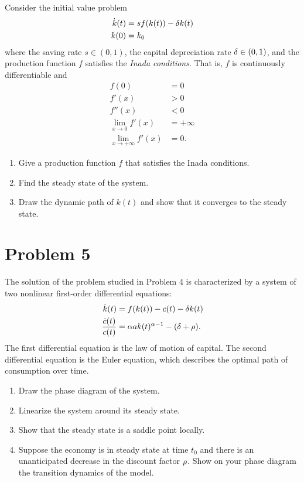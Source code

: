 \documentclass[letterpaper, 11pt, leqno]{article}
\begin{document}
Consider the initial value problem 
\begin{align*}
\dot{k}(t) &=s f(k(t)) -\delta k(t) \\
k(0) &=k_{0}
\end{align*}
where the saving rate $s\in (0,1)$, the capital depreciation rate $\delta \in (0,1)$, and the production function $f$ satisfies the \textit{Inada conditions}. That is, $f$ is continuously differentiable and 
\begin{align*}
f(0)&=0\\
f'(x)&>0\\
f''(x)&<0\\
\lim_{x\to 0} f'(x)&=+\infty\\
\lim_{x\to +\infty} f'(x)&=0.
\end{align*}

\begin{enumerate}
\item Give a production function $f$ that satisfies the Inada conditions.
\item Find the steady state of the system.
\item Draw the dynamic path of $k(t)$ and show that it converges to the steady state.
\end{enumerate}

\section*{Problem 5}

The solution of the problem studied in Problem 4 is characterized by a system of two nonlinear first-order differential equations:
\begin{align*}
\dot{k}(t) &=f(k(t)) -c(t)-\delta k(t)\\
\frac{\dot{c}(t)}{c(t)} &=\alpha  a k(t)^{\alpha -1}-(\delta +\rho).
\end{align*}
The first differential equation is the law of motion of capital. The second differential equation is the Euler equation, which describes the optimal path of consumption over time.

\begin{enumerate}
\item Draw the phase diagram of the system.
\item Linearize the system around its steady state.
\item Show that the steady state is a saddle point locally.
\item Suppose the economy is in steady state at time $t_{0}$ and there is an unanticipated decrease in the discount factor $\rho$. Show on your phase diagram the transition dynamics of the model.
\end{enumerate}
\end{document}
